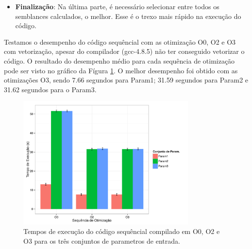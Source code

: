 \documentclass[12pt]{article}
\begin{document}
\begin{itemize}
\begin{lstlisting}[language=c, caption=Corpo da função \textit{semblance\_2d}., label=semblance]
    for (int i = 0; i < ap->traces.len; i++) {
        tr = vector_get(ap->traces, i);

        float mx, my, hx, hy;
        su_get_midpoint(tr, &mx, &my);
        su_get_halfoffset(tr, &hx, &hy);

        float t = time_2d(A, B, C, D, E, t0, m0, my, h0, hy);
        int it = (int)(t * idt);

        if (it - tau >= 0 && it + tau < tr->ns) {
            for (int j = 0; j < w; j++) {
                int k = it + j - tau;
                float v = interpol_linear(k, k+1,
                        tr->data[k], tr->data[k+1],
                        t*idt + j - tau);
                num[j] += v;
                den[j] += v*v;
                _stack += v;
            }
            M++;
        } else if (++skip == 2) {
            return 0;
        }
    }
\end{lstlisting}

A função \textit{semblance\_2d} possui dois acessos a dados na memória, o primeiro, na linha 2, acessa os \textit{traces} e o seguindo, dentro do \textit{loop}, acessa \textit{data}. Ambos os acessos são sequênciais, por isso, acredita-se que tenham boa localidade.
\\
\item \textbf{Finalização}: Na última parte, é necessário selecionar entre todos os semblances calculados, o melhor. Esse é o trexo mais rápido na execução do código.

\end{itemize}

Testamos o desempenho do código sequêncial com as otimização O0, O2 e O3 com vetorização, apesar do compilador (gcc-4.8.5) não ter conseguido vetorizar o código. O resultado do desempenho médio para cada sequência de otimização pode ser visto no gráfico da Fígura \ref{fgsequencial}. O melhor desempenho foi obtido com as otimizações O3, sendo 7.66 segundos para Param1; 31.59 segundos para Param2 e 31.62 segundos para o Param3.

\begin{figure}[H]
\centering
\includegraphics[width=0.8\textwidth]{seq.pdf}
\caption{Tempos de execução do código sequêncial compilado em O0, O2 e O3 para os três conjuntos de parametros de entrada.}
\label{fgsequencial}
\end{figure}
\end{document}

